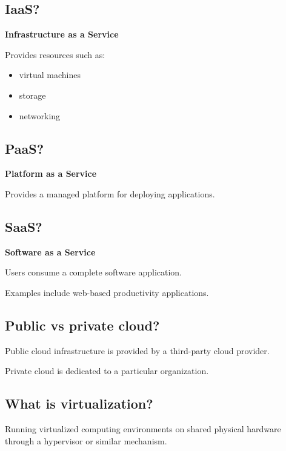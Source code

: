 \medskip

\subsection{IaaS?}

\textbf{Infrastructure as a Service}

Provides resources such as:

\begin{itemize}
  \item virtual machines
  \item storage
  \item networking
\end{itemize}

\medskip

\subsection{PaaS?}

\textbf{Platform as a Service}

Provides a managed platform for deploying applications.

\medskip

\subsection{SaaS?}

\textbf{Software as a Service}

Users consume a complete software application.

Examples include web-based productivity applications.

\medskip

\subsection{Public vs private cloud?}

Public cloud infrastructure is provided by a third-party cloud provider.

Private cloud is dedicated to a particular organization.

\medskip

\subsection{What is virtualization?}

Running virtualized computing environments on shared physical hardware through a hypervisor or similar mechanism.

